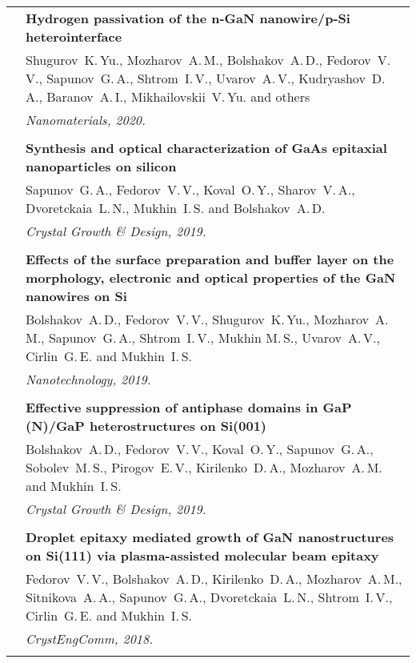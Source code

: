 \documentclass[letterpaper, 11pt]{article}
\begin{document}
\begin{longtable}{p{1.3in}p{4.8in}}
        & \textbf{Hydrogen passivation of the n-GaN nanowire/p-Si
        heterointerface} \\
        & Shugurov~K.\,Yu., Mozharov~A.\,M., Bolshakov~A.\,D., Fedorov~V.\,V.,
        Sapunov~G.\,A., Shtrom~I.\,V., Uvarov~A.\,V., Kudryashov~D.\,A.,
        Baranov~A.\,I., Mikhailovskii~V.\,Yu. and others \\
		& \textit{Nanomaterials, 2020.}\\
		& \\
		
        & \textbf{Synthesis and optical characterization of GaAs epitaxial
        nanoparticles on silicon} \\
        & Sapunov~G.\,A., Fedorov~V.\,V., Koval~O.\,Y., Sharov~V.\,A.,
        Dvoretckaia~L.\,N., Mukhin~I.\,S. and Bolshakov~A.\,D. \\
		& \textit{Crystal Growth \& Design, 2019.}\\
		& \\
		
        & \textbf{Effects of the surface preparation and buffer layer on the
        morphology, electronic and optical properties of the GaN nanowires on
        Si} \\ & Bolshakov~A.\,D., Fedorov~V.\,V., Shugurov~K.\,Yu., Mozharov~A.\,M.,
        Sapunov~G.\,A., Shtrom~I.\,V., Mukhin M.\,S., Uvarov~A.\,V.,
        Cirlin~G.\,E. and Mukhin~I.\,S. \\
		& \textit{Nanotechnology, 2019.}\\
		& \\
		
        & \textbf{Effective suppression of antiphase domains in GaP (N)/GaP
        heterostructures on Si(001)} \\
        & Bolshakov~A.\,D., Fedorov~V.\,V., Koval~O.\,Y., Sapunov~G.\,A.,
        Sobolev~M.\,S., Pirogov~E.\,V., Kirilenko~D.\,A., Mozharov~A.\,M. and
        Mukhin~I.\,S. \\
		& \textit{Crystal Growth \& Design, 2019.}\\
		& \\
		
        & \textbf{Droplet epitaxy mediated growth of GaN nanostructures on
        Si(111) via plasma-assisted molecular beam epitaxy} \\
        & Fedorov~V.\,V., Bolshakov~A.\,D., Kirilenko~D.\,A., Mozharov~A.\,M.,
        Sitnikova~A.\,A., Sapunov~G.\,A., Dvoretckaia~L.\,N., Shtrom~I.\,V.,
        Cirlin~G.\,E. and Mukhin~I.\,S. \\
		& \textit{CrystEngComm, 2018.}\\
		& \\


\end{longtable}
\end{document}
